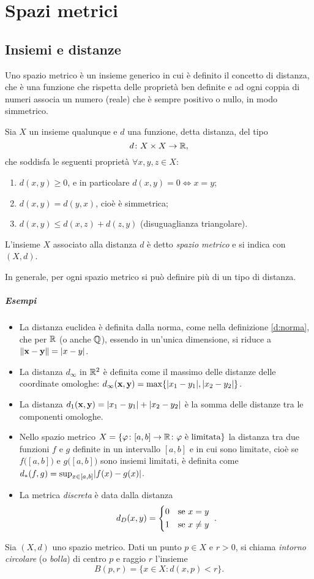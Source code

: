 \chapter{Spazi metrici}
\section{Insiemi e distanze}
Uno spazio metrico è un insieme generico in cui è definito il concetto di distanza, che è una funzione che rispetta delle proprietà ben definite e ad ogni coppia di numeri associa un numero (reale) che è sempre positivo o nullo, in modo simmetrico.
\begin{definizione}
Sia $X$ un insieme qualunque e $d$ una funzione, detta distanza, del tipo
\[
d\colon X\times X\to\mathbb{R},
\]
che soddisfa le seguenti proprietà $\forall x,y,z\in X$:
\begin{enumerate}
\item $d(x,y)\geq 0$, e in particolare $d(x,y)=0\iff x=y$;
\item $d(x,y)=d(y,x)$, cioè è simmetrica;
\item $d(x,y)\leq d(x,z)+d(z,y)$ (disuguaglianza triangolare).
\end{enumerate}
L'insieme $X$ associato alla distanza $d$ è detto \emph{spazio metrico} e si indica con $(X,d)$.
\end{definizione}
In generale, per ogni spazio metrico si può definire più di un tipo di distanza.
\paragraph{Esempi}
\begin{itemize}
\item La distanza euclidea è definita dalla norma, come nella definizione \ref{d:norma}, che per $\mathbb{R}$ (o anche $\mathbb{Q}$), essendo in un'unica dimensione, si riduce a $\lVert\mathbf{x}-\mathbf{y}\rVert=\lvert x-y\rvert$.
\item La distanza $d_\infty$ in $\mathbb{R}^2$ è definita come il massimo delle distanze delle coordinate omologhe: $d_\infty(\mathbf{x},\mathbf{y})=\max\{\lvert x_1-y_1\rvert,\lvert x_2-y_2\rvert\}$.
\item La distanza $d_1(\mathbf{x},\mathbf{y})=\lvert x_1-y_1\rvert+\lvert x_2-y_2\rvert$ è la somma delle distanze tra le componenti omologhe.
\item Nello spazio metrico $X=\{\varphi\colon[a,b]\to\mathbb{R}\colon\varphi\text{ è limitata}\}$ la distanza tra due funzioni $f$ e $g$ definite in un intervallo $[a,b]$ e in cui sono limitate, cioè se $f\big([a,b]\big)$ e $g\big([a,b]\big)$ sono insiemi limitati, è definita come $d_*(f,g)=\sup_{x\in[a,b]}\lvert f(x)-g(x)\rvert$.
\item La metrica \emph{discreta} è data dalla distanza
\[
d_D(x,y)=
\begin{cases*}
0&se $x=y$\\
1&se $x\neq y$
\end{cases*}.
\]

\end{itemize}
\begin{definizione}
Sia $(X,d)$ uno spazio metrico. Dati un punto $p\in X$ e $r>0$, si chiama \emph{intorno circolare} (o \emph{bolla}) di centro $p$ e raggio $r$ l'insieme
\[
B(p,r)=\{x\in X\colon d(x,p)<r\}.
\]
\end{definizione}
